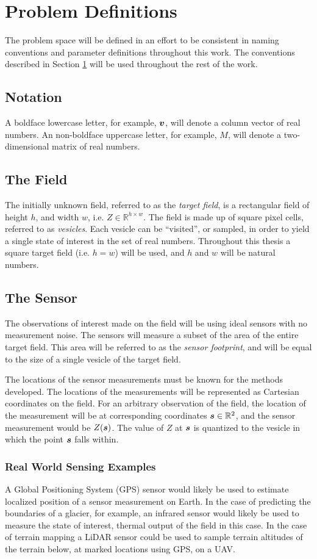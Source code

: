 \section{Problem Definitions} \label{ch:defs}
The problem space will be defined in an effort to be consistent in naming conventions and parameter definitions throughout this work. The conventions described in Section \ref{ch:defs} will be used throughout the rest of the work.

\subsection{Notation}
A boldface lowercase letter, for example, ${\it{\boldsymbol{v}}}$, will denote a column vector of real numbers. An non-boldface uppercase letter, for example, $M$, will denote a two-dimensional matrix of real numbers.

\subsection{The Field}
The initially unknown field, referred to as the \textit{target field}, is a rectangular field of height $h$, and width $w$, i.e. $Z \in \mathbb{R}^{h \times w}$. The field is made up of square pixel cells, referred to as \textit{vesicles}. Each vesicle can be ``visited'', or sampled, in order to yield a single state of interest in the set of real numbers. Throughout this thesis a square target field (i.e. $h = w$) will be used, and $h$ and $w$ will be natural numbers.

\subsection{The Sensor} \label{sec:sensor_measurements}
The observations of interest made on the field will be using ideal sensors with no measurement noise. The sensors will measure a subset of the area of the entire target field. This area will be referred to as the \textit{sensor footprint}, and will be equal to the size of a single vesicle of the target field.

The locations of the sensor measurements must be known for the methods developed. The locations of the measurements will be represented as Cartesian coordinates on the field. For an arbitrary observation of the field, the location of the measurement will be at corresponding coordinates ${\it{\boldsymbol{s}}} \in \mathbb{R}^2$, and the  sensor measurement would be $Z({\it{\boldsymbol{s}}})$. The value of $Z$ at ${\it{\boldsymbol{s}}}$ is quantized to the vesicle in which the point ${\it{\boldsymbol{s}}}$ falls within.

\subsubsection{Real World Sensing Examples}
A Global Positioning System (GPS) sensor would likely be used to estimate localized position of a sensor measurement on Earth. In the case of predicting the boundaries of a glacier, for example, an infrared sensor would likely be used to measure the state of interest, thermal output of the field in this case. In the case of terrain mapping a LiDAR sensor could be used to sample terrain altitudes of the terrain below, at marked locations using GPS, on a UAV.
